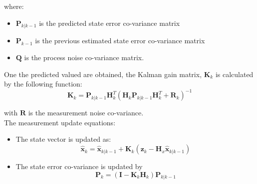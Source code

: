 where:
\begin{itemize}
    \item $\textbf{P}_{k|k-1}$ is the predicted state error co-variance matrix
    \item $\textbf{P}_{k-1}$ is the previous estimated state error co-variance matrix
    \item $\textbf{Q}$ is the process noise co-variance matrix.
\end{itemize}
One the predicted valued are obtained, the Kalman gain matrix, $\textbf{K}_k$ is calculated by the following function:
\begin{displaymath}
              \textbf{K}_k = \textbf{P}_{k|k-1} \textbf{H}^T_k(\textbf{H}_k\textbf{P}_{k|k-1} \textbf{H}^T_k + \textbf{R}_k)^{-1}    
\end{displaymath}

with $\textbf{R}$ is the measurement noise co-variance.\\
The measurement update equations:
\begin{itemize}
    \item The state vector is updated as:
        \begin{displaymath}
                      \hat{\textbf{x}}_k = \hat{\textbf{x}}_{k|k-1} + \textbf{K}_k(\textbf{z}_k - \textbf{H}_x\hat{\textbf{x}}_{k|k-1})
        \end{displaymath}
    \item The state error co-variance is updated by
        \begin{displaymath}
                      \textbf{P}_k = (\textbf{I} -  \textbf{K}_k\textbf{H}_k)\textbf{P}_{k|k-1}
        \end{displaymath}
\end{itemize}